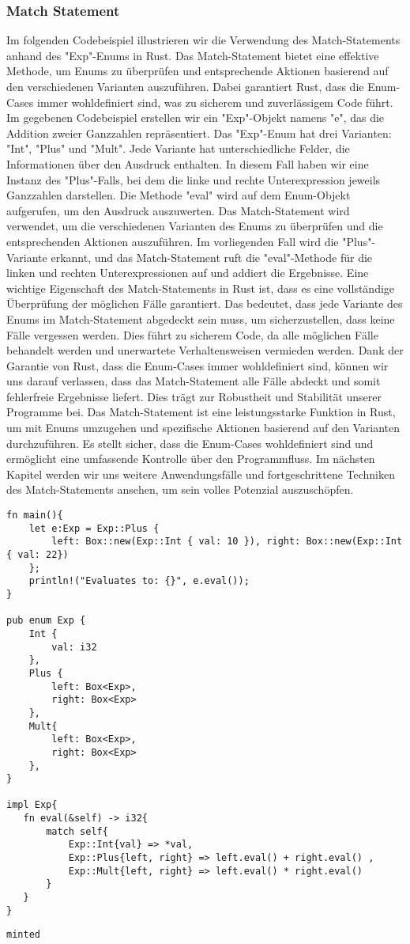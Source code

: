 \documentclass[a4paper, 1ppt]{article}
\begin{document}
\subsubsection{Match Statement}
Im folgenden Codebeispiel illustrieren wir die Verwendung des Match-Statements anhand des "Exp"-Enums in Rust. Das Match-Statement bietet eine effektive Methode, um Enums zu überprüfen und entsprechende Aktionen basierend auf den verschiedenen Varianten auszuführen. Dabei garantiert Rust, dass die Enum-Cases immer wohldefiniert sind, was zu sicherem und zuverlässigem Code führt.
Im gegebenen Codebeispiel erstellen wir ein "Exp"-Objekt namens "e", das die Addition zweier Ganzzahlen repräsentiert. Das "Exp"-Enum hat drei Varianten: "Int", "Plus" und "Mult". Jede Variante hat unterschiedliche Felder, die Informationen über den Ausdruck enthalten. In diesem Fall haben wir eine Instanz des "Plus"-Falls, bei dem die linke und rechte Unterexpression jeweils Ganzzahlen darstellen.
Die Methode "eval" wird auf dem Enum-Objekt aufgerufen, um den Ausdruck auszuwerten. Das Match-Statement wird verwendet, um die verschiedenen Varianten des Enums zu überprüfen und die entsprechenden Aktionen auszuführen. Im vorliegenden Fall wird die "Plus"-Variante erkannt, und das Match-Statement ruft die "eval"-Methode für die linken und rechten Unterexpressionen auf und addiert die Ergebnisse.
Eine wichtige Eigenschaft des Match-Statements in Rust ist, dass es eine vollständige Überprüfung der möglichen Fälle garantiert. Das bedeutet, dass jede Variante des Enums im Match-Statement abgedeckt sein muss, um sicherzustellen, dass keine Fälle vergessen werden. Dies führt zu sicherem Code, da alle möglichen Fälle behandelt werden und unerwartete Verhaltensweisen vermieden werden.
Dank der Garantie von Rust, dass die Enum-Cases immer wohldefiniert sind, können wir uns darauf verlassen, dass das Match-Statement alle Fälle abdeckt und somit fehlerfreie Ergebnisse liefert. Dies trägt zur Robustheit und Stabilität unserer Programme bei.
Das Match-Statement ist eine leistungsstarke Funktion in Rust, um mit Enums umzugehen und spezifische Aktionen basierend auf den Varianten durchzuführen. Es stellt sicher, dass die Enum-Cases wohldefiniert sind und ermöglicht eine umfassende Kontrolle über den Programmfluss. Im nächsten Kapitel werden wir uns weitere Anwendungsfälle und fortgeschrittene Techniken des Match-Statements ansehen, um sein volles Potenzial auszuschöpfen.
\begin{verbatim}
fn main(){
    let e:Exp = Exp::Plus { 
        left: Box::new(Exp::Int { val: 10 }), right: Box::new(Exp::Int { val: 22})
    };
    println!("Evaluates to: {}", e.eval());
}

pub enum Exp {
    Int {
        val: i32
    },
    Plus {
        left: Box<Exp>,
        right: Box<Exp>
    },
    Mult{
        left: Box<Exp>,
        right: Box<Exp>
    },
}

impl Exp{
   fn eval(&self) -> i32{
       match self{
           Exp::Int{val} => *val,
           Exp::Plus{left, right} => left.eval() + right.eval() ,
           Exp::Mult{left, right} => left.eval() * right.eval()
       }
   }
}
\end{verbatim}
\begin{verbatim}
minted\end{verbatim}
\end{document}
